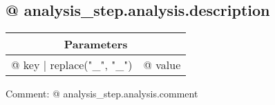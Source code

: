 \subsection{{@ analysis_step.analysis.description }}

\vspace*{1ex}
\begin{tabular}{ll}
\toprule
\multicolumn{2}{c}{\textbf{Parameters}}
\\
\midrule
{@ key | replace("_", "\_") } & {@ value }
\\
\bottomrule
\end{tabular}
\vspace*{1ex}

Comment: {@ analysis_step.analysis.comment }
